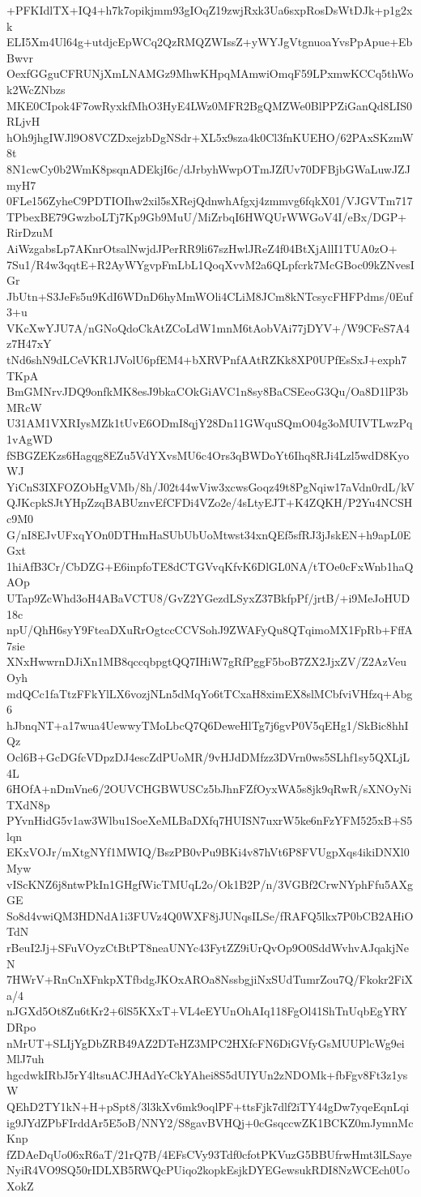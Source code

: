 +PFKIdlTX+IQ4+h7k7opikjmm93gIOqZ19zwjRxk3Ua6sxpRosDsWtDJk+p1g2xk
ELI5Xm4Ul64g+utdjcEpWCq2QzRMQZWIssZ+yWYJgVtgnuoaYvsPpApue+EbBwvr
OexfGGguCFRUNjXmLNAMGz9MhwKHpqMAmwiOmqF59LPxmwKCCq5thWok2WcZNbzs
MKE0CIpok4F7owRyxkfMhO3HyE4LWz0MFR2BgQMZWe0BlPPZiGanQd8LIS0RLjvH
hOh9jhgIWJl9O8VCZDxejzbDgNSdr+XL5x9sza4k0Cl3fnKUEHO/62PAxSKzmW8t
8N1cwCy0b2WmK8psqnADEkjI6c/dJrbyhWwpOTmJZfUv70DFBjbGWaLuwJZJmyH7
0FLe156ZyheC9PDTIOIhw2xil5sXRejQdnwhAfgxj4zmmvg6fqkX01/VJGVTm717
TPbexBE79GwzboLTj7Kp9Gb9MuU/MiZrbqI6HWQUrWWGoV4I/eBx/DGP+RirDzuM
AiWzgabsLp7AKnrOtsalNwjdJPerRR9li67szHwlJReZ4f04BtXjAllI1TUA0zO+
7Su1/R4w3qqtE+R2AyWYgvpFmLbL1QoqXvvM2a6QLpfcrk7McGBoc09kZNvesIGr
JbUtn+S3JeFs5u9KdI6WDnD6hyMmWOli4CLiM8JCm8kNTcsycFHFPdms/0Euf3+u
VKcXwYJU7A/nGNoQdoCkAtZCoLdW1mnM6tAobVAi77jDYV+/W9CFeS7A4z7H47xY
tNd6shN9dLCeVKR1JVolU6pfEM4+bXRVPnfAAtRZKk8XP0UPfEsSxJ+exph7TKpA
BmGMNrvJDQ9onfkMK8esJ9bkaCOkGiAVC1n8sy8BaCSEeoG3Qu/Oa8D1lP3bMRcW
U31AM1VXRIysMZk1tUvE6ODmI8qjY28Dn11GWquSQmO04g3oMUIVTLwzPq1vAgWD
fSBGZEKzs6Hagqg8EZu5VdYXvsMU6c4Ors3qBWDoYt6Ihq8RJi4Lzl5wdD8KyoWJ
YiCnS3IXFOZObHgVMb/8h/J02t44wViw3xcwsGoqz49t8PgNqiw17aVdn0rdL/kV
QJKcpkSJtYHpZzqBABUznvEfCFDi4VZo2e/4sLtyEJT+K4ZQKH/P2Yu4NCSHc9M0
G/nI8EJvUFxqYOn0DTHmHaSUbUbUoMtwst34xnQEf5sfRJ3jJskEN+h9apL0EGxt
1hiAfB3Cr/CbDZG+E6inpfoTE8dCTGVvqKfvK6DlGL0NA/tTOe0cFxWnb1haQAOp
UTap9ZcWhd3oH4ABaVCTU8/GvZ2YGezdLSyxZ37BkfpPf/jrtB/+i9MeJoHUD18c
npU/QhH6syY9FteaDXuRrOgtccCCVSohJ9ZWAFyQu8QTqimoMX1FpRb+FffA7sie
XNxHwwrnDJiXn1MB8qccqbpgtQQ7IHiW7gRfPggF5boB7ZX2JjxZV/Z2AzVeuOyh
mdQCc1faTtzFFkYlLX6vozjNLn5dMqYo6tTCxaH8ximEX8slMCbfviVHfzq+Abg6
hJbnqNT+a17wua4UewwyTMoLbcQ7Q6DeweHlTg7j6gvP0V5qEHg1/SkBic8hhIQz
Ocl6B+GcDGfcVDpzDJ4escZdPUoMR/9vHJdDMfzz3DVrn0ws5SLhf1sy5QXLjL4L
6HOfA+nDmVne6/2OUVCHGBWUSCz5bJhnFZfOyxWA5s8jk9qRwR/sXNOyNiTXdN8p
PYvnHidG5v1aw3Wlbu1SoeXeMLBaDXfq7HUISN7uxrW5ke6nFzYFM525xB+S5lqn
EKxVOJr/mXtgNYf1MWIQ/BszPB0vPu9BKi4v87hVt6P8FVUgpXqs4ikiDNXl0Myw
vIScKNZ6j8ntwPkIn1GHgfWicTMUqL2o/Ok1B2P/n/3VGBf2CrwNYphFfu5AXgGE
So8d4vwiQM3HDNdA1i3FUVz4Q0WXF8jJUNqsILSe/fRAFQ5lkx7P0bCB2AHiOTdN
rBeuI2Jj+SFuVOyzCtBtPT8neaUNYc43FytZZ9iUrQvOp9O0SddWvhvAJqakjNeN
7HWrV+RnCnXFnkpXTfbdgJKOxAROa8NssbgjiNxSUdTumrZou7Q/Fkokr2FiXa/4
nJGXd5Ot8Zu6tKr2+6lS5KXxT+VL4eEYUnOhAIq118FgOl41ShTnUqbEgYRYDRpo
nMrUT+SLIjYgDbZRB49AZ2DTeHZ3MPC2HXfcFN6DiGVfyGsMUUPlcWg9eiMlJ7uh
hgcdwkIRbJ5rY4ltsuACJHAdYcCkYAhei8S5dUIYUn2zNDOMk+fbFgv8Ft3z1ysW
QEhD2TY1kN+H+pSpt8/3l3kXv6mk9oqlPF+ttsFjk7dlf2iTY44gDw7yqeEqnLqi
ig9JYdZPbFIrddAr5E5oB/NNY2/S8gavBVHQj+0cGsqccwZK1BCKZ0mJymnMcKnp
fZDAeDqUo06xR6aT/21rQ7B/4EFsCVy93Tdf0cfotPKVuzG5BBUfrwHmt3lLSaye
NyiR4VO9SQ50rIDLXB5RWQcPUiqo2kopkEsjkDYEGewsukRDI8NzWCEch0UoXokZ
